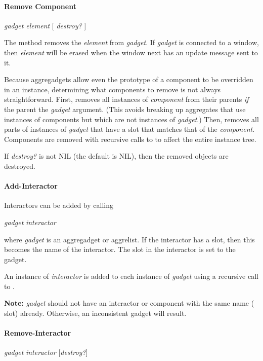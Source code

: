 \paragraph{Remove Component}
\label{remove-component-sec}

 {\it gadget element} [ {\it destroy?} ]\value{Method}

The  method removes the
{\it element} from {\it gadget}.  If {\it gadget} is connected to
a window, then {\it element} will be erased when the
window next has an update message sent to it.


Because aggregadgets allow
even the prototype of a component to be overridden in an instance,
determining what components to remove is not always straightforward.
First,  removes all instances of {\it component}
from their parents {\it if} the parent  the {\it gadget} argument.
(This avoids breaking up aggregates that use instances of components but
which are not instances of {\it gadget}.)  Then, 
removes all parts of instances of {\it gadget}
that have a  slot that matches that of
the {\it component}.  Components are removed with recursive calls to
 to affect the entire instance tree.

If {\it destroy?} is not NIL (the default is NIL), then the removed objects
are destroyed.


\paragraph{Add-Interactor}
Interactors can be added by calling

 {\it gadget} {\it interactor}\value{method}

where {\it gadget} is an aggregadget or aggrelist.  If the
interactor has a  slot, then this becomes the
name of the interactor.  The 
slot in the interactor is set to the gadget.

An instance of {\it interactor} is added to each instance of
{\it gadget} using a recursive call to .

{\bf Note:} {\it gadget} should not have an interactor or component
with the same name ( slot) already.  Otherwise,
an inconsistent gadget will result.


\paragraph{Remove-Interactor}
 {\it gadget} {\it interactor} [{\it destroy?}]\value{method}

